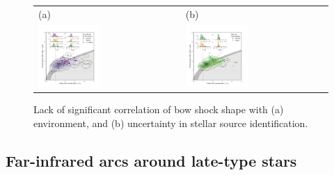 \begin{figure}
  \centering
  \begin{tabular}{ll}
    (a) & (b) \\
    \includegraphics[width=0.45\textwidth]{figs/mipsgal-Rc-R90-environment} &
    \includegraphics[width=0.45\textwidth]{figs/mipsgal-Rc-R90-candidates} 
  \end{tabular}
  \caption[]{Lack of significant correlation of bow shock shape with
    (a) environment, and (b) uncertainty in stellar source
    identification.}
  \label{fig:mipsgal-uncorrelated}
\end{figure}


\subsection{Far-infrared arcs around late-type stars}
\label{sec:far-infrared-arcs}

